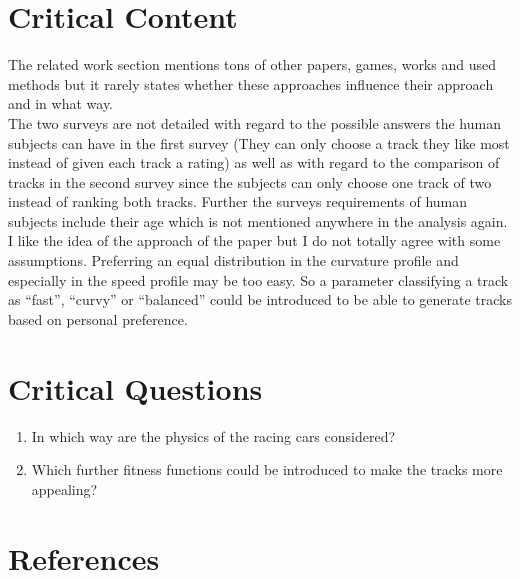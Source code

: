 \documentclass[oneside, notitlepage, twocolumn]{scrartcl}
\begin{document}
\section{Critical Content}
The related work section mentions tons of other papers, games, works and used methods but it rarely states whether these approaches influence their approach and in what way.\\
The two surveys are not detailed with regard to the possible answers the human subjects can have in the first survey (They can only choose a track they like most instead of given each track a rating) as well as with regard to the comparison of tracks in the second survey since the subjects can only choose one track of two instead of ranking both tracks.
Further the surveys requirements of human subjects include their age which is not mentioned anywhere in the analysis again.\\
I like the idea of the approach of the paper but I do not totally agree with some assumptions.
Preferring an equal distribution in the curvature profile and especially in the speed profile may be too easy.
So a parameter classifying a track as ``fast'', ``curvy'' or ``balanced'' could be introduced to be able to generate tracks based on personal preference.

\section{Critical Questions}
\begin{enumerate}
    \item In which way are the physics of the racing cars considered?
    \item Which further fitness functions could be introduced to make the tracks more appealing?
\end{enumerate}

\section{References}
\begingroup
\renewcommand{\section}[2]{}%
\nocite{*}
\printbibliography
\endgroup
\end{document}
